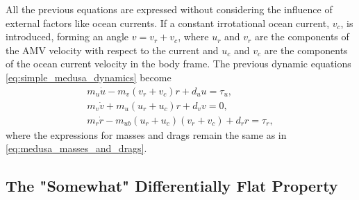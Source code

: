 \par All the previous equations are expressed without considering the influence of external factors like ocean currents. If a constant irrotational ocean current, $v_c$, is introduced, forming an angle $v = v_r+v_c$, where $u_r$ and $v_r$ are the components of the \acs{AMV} velocity with respect to the current and $u_c$ and $v_c$ are the components of the ocean current velocity in the body frame.
The previous dynamic equations \eqref{eq:simple_medusa_dynamics} become
\begin{equation}
    \begin{gathered}
        m_u\dot{u}-m_v(v_r+v_c)r+d_u u=\tau_u, \\
        m_v\dot{v}+m_u(u_r+u_c) r + d_v v=0, \\
        m_r\dot{r}-m_{ub}(u_r+u_c)(v_r+v_c)+d_r r=\tau_r,
    \end{gathered}
\end{equation}
where the expressions for masses and drags remain the same as in \eqref{eq:medusa_masses_and_drags}.

\subsection{The "Somewhat" Differentially Flat Property}

